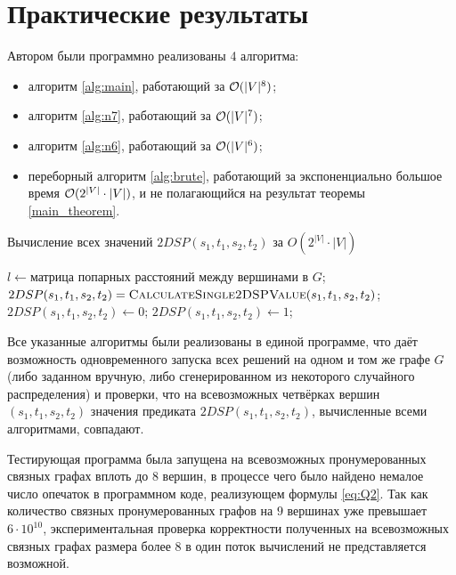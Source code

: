 \chapter{Практические результаты}

Автором были программно реализованы 4 алгоритма: 

\begin{itemize}
\item алгоритм \ref{alg:main}, работающий за $\mathcal{O}(|V|^8)$;
\item алгоритм \ref{alg:n7}, работающий за $\mathcal{O}(|V|^7)$;
\item алгоритм \ref{alg:n6}, работающий за $\mathcal{O}(|V|^6)$;
\item переборный алгоритм \ref{alg:brute}, работающий за экспоненциально большое время ${\mathcal{O}(2^{|V|} \cdot |V|)}$, и не полагающийся на результат теоремы \ref{main_theorem}.
\end{itemize}

\begin{algorithm}
\caption{Вычисление всех значений $2DSP(s_1, t_1, s_2, t_2)$ за $O(2^{|V|} \cdot |V|)$} \label{alg:brute}
\begin{algorithmic}[1]
\State $l \gets \text{матрица попарных расстояний между вершинами в }G$; \label{line:floyd}
    \State $2DSP(s_1, t_1, s_2, t_2) = \textsc{CalculateSingle2DSPValue}(s_1, t_1, s_2, t_2)$;
\EndFor
\EndProcedure
\Statex
{}
\State $2DSP(s_1, t_1, s_2, t_2) \gets 0$;
        \State $2DSP(s_1, t_1, s_2, t_2) \gets 1$;
    \EndIf
\EndFor
\EndProcedure
\end{algorithmic}
\end{algorithm}

Все указанные алгоритмы были реализованы в единой программе, что даёт возможность одновременного запуска всех решений на одном и том же графе $G$ (либо заданном вручную, либо сгенерированном из некоторого случайного распределения) и проверки, что на всевозможных четвёрках вершин $(s_1, t_1, s_2, t_2)$ значения предиката $2DSP(s_1, t_1, s_2, t_2)$, вычисленные всеми алгоритмами, совпадают.

Тестирующая программа была запущена на всевозможных пронумерованных связных графах вплоть до $8$ вершин, в процессе чего было найдено немалое число опечаток в программном коде, реализующем формулы \eqref{eq:Q2}. Так как количество связных пронумерованных графов на $9$ вершинах уже превышает $6 \cdot 10^{10}$, экспериментальная проверка корректности полученных на всевозможных связных графах размера более 8 в один поток вычислений не представляется возможной.

